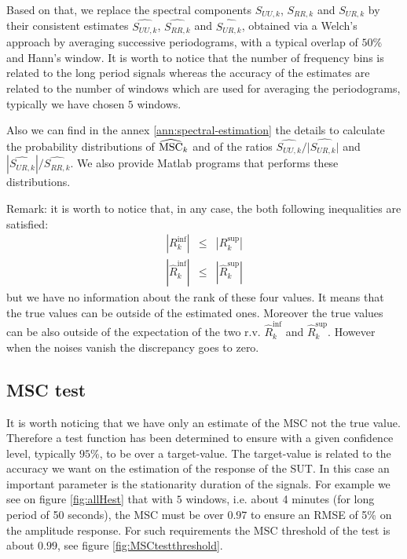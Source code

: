 
Based on that, we replace the spectral components $S_{UU,k}$, $S_{RR,k}$ and $S_{UR,k}$ by their consistent estimates $\widehat{S_{UU,k}}$, $\widehat{S_{RR,k}}$ and $\widehat{S_{UR,k}}$, obtained via a Welch's approach by averaging successive periodograms, with a typical overlap of $50\%$ and Hann's window. It is worth to notice that the number of frequency  bins is related to the long period signals whereas the accuracy of the estimates are related to the number of windows which are used for averaging the periodograms, typically we have chosen $5$ windows. 


Also we can find in the annex \ref{ann:spectral-estimation} the details to calculate the probability distributions of $\widehat{\mathrm{MSC}}_{k}$ and of the ratios $\widehat{S_{UU,k}}/|\widehat{S_{UR,k}|}$ and $|\widehat{S_{UR,k}}|/\widehat{S_{RR,k}}$. We also provide Matlab programs that performs these distributions. 


Remark: it is worth to notice that, in any case, the both following inequalities are satisfied:
\begin{eqnarray}
 |R_{k}^{\inf}|&\leq &|R_{k}^{\sup}|
 \\
  |\widehat{R}_{k}^{\inf}|&\leq &|\widehat{R}_{k}^{\sup}|
\end{eqnarray}
but we have no information about the rank of these four values. It means that the true values can be outside of the estimated ones. Moreover the true values can be also outside of the expectation of the two r.v. $\widehat{R}_{k}^{\inf}$ and $\widehat{R}_{k}^{\sup}$. However when the noises vanish the discrepancy goes to zero.

\subsection{MSC test}

It is worth noticing that we have only an estimate of the MSC not the true value. Therefore a test function has been determined to ensure with a given confidence level, typically $95\%$, to be over a target-value. The target-value is related to the accuracy we want on the estimation of the response of the SUT. In this case an important parameter is the  stationarity duration of the signals. For example we see on figure \ref{fig:allHest} that with $5$ windows, i.e. about 4 minutes (for long period of 50 seconds), the MSC must be over $0.97$ to ensure an RMSE of 5\% on the amplitude response. For such requirements the MSC threshold of the test is about $0.99$, see figure \ref{fig:MSCtestthreshold}.

